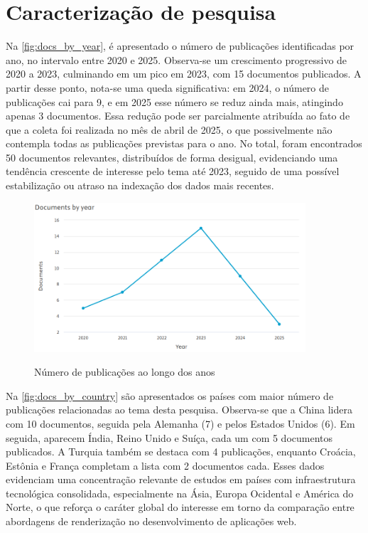 \section{Caracterização de pesquisa}
\label{section:caracterizacao_pesquisa}
Na \autoref{fig:docs_by_year}, é apresentado o número de publicações identificadas por ano, no intervalo entre 2020 e 2025. Observa-se um crescimento progressivo de 2020 a 2023, culminando em um pico em 2023, com 15 documentos publicados. A partir desse ponto, nota-se uma queda significativa: em 2024, o número de publicações cai para 9, e em 2025 esse número se reduz ainda mais, atingindo apenas 3 documentos. Essa redução pode ser parcialmente atribuída ao fato de que a coleta foi realizada no mês de abril de 2025, o que possivelmente não contempla todas as publicações previstas para o ano. No total, foram encontrados 50 documentos relevantes, distribuídos de forma desigual, evidenciando uma tendência crescente de interesse pelo tema até 2023, seguido de uma possível estabilização ou atraso na indexação dos dados mais recentes.

\begin{figure}[H]
    \centering
    \caption{Número de publicações ao longo dos anos}
    \includegraphics[width=0.9\textwidth]{media/docs_by_year.png}
    \label{fig:docs_by_year}
\end{figure}

Na \autoref{fig:docs_by_country} são apresentados os países com maior número de publicações relacionadas ao tema desta pesquisa. Observa-se que a China lidera com 10 documentos, seguida pela Alemanha (7) e pelos Estados Unidos (6). Em seguida, aparecem Índia, Reino Unido e Suíça, cada um com 5 documentos publicados. A Turquia também se destaca com 4 publicações, enquanto Croácia, Estônia e França completam a lista com 2 documentos cada. Esses dados evidenciam uma concentração relevante de estudos em países com infraestrutura tecnológica consolidada, especialmente na Ásia, Europa Ocidental e América do Norte, o que reforça o caráter global do interesse em torno da comparação entre abordagens de renderização no desenvolvimento de aplicações web.

